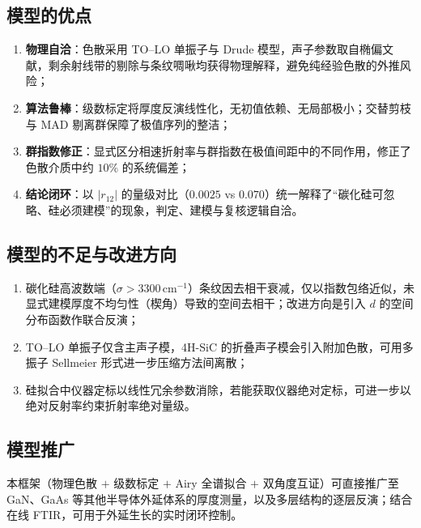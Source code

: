 \documentclass[11pt,a4paper,fontset=fandol]{ctexart}
\newcommand{\invcm}{\,\mathrm{cm^{-1}}}
\begin{document}
\subsection{模型的优点}
\begin{enumerate}[label=（\arabic*）, leftmargin=2.4em, itemsep=0.1em]
    \item \textbf{物理自洽}：色散采用 TO--LO 单振子与 Drude 模型，声子参数取自椭偏文献，剩余射线带的剔除与条纹啁啾均获得物理解释，避免纯经验色散的外推风险；
    \item \textbf{算法鲁棒}：级数标定将厚度反演线性化，无初值依赖、无局部极小；交替剪枝与 MAD 剔离群保障了极值序列的整洁；
    \item \textbf{群指数修正}：显式区分相速折射率与群指数在极值间距中的不同作用，修正了色散介质中约 $10\%$ 的系统偏差；
    \item \textbf{结论闭环}：以 $|r_{12}|$ 的量级对比（$0.0025$ vs $0.070$）统一解释了``碳化硅可忽略、硅必须建模''的现象，判定、建模与复核逻辑自洽。
\end{enumerate}

\subsection{模型的不足与改进方向}
\begin{enumerate}[label=（\arabic*）, leftmargin=2.4em, itemsep=0.1em]
    \item 碳化硅高波数端（$\sigma>3300\invcm$）条纹因去相干衰减，仅以指数包络近似，未显式建模厚度不均匀性（楔角）导致的空间去相干；改进方向是引入 $d$ 的空间分布函数作联合反演；
    \item TO--LO 单振子仅含主声子模，4H-SiC 的折叠声子模会引入附加色散，可用多振子 Sellmeier 形式进一步压缩方法间离散；
    \item 硅拟合中仪器定标以线性冗余参数消除，若能获取仪器绝对定标，可进一步以绝对反射率约束折射率绝对量级。
\end{enumerate}

\subsection{模型推广}
本框架（物理色散 $+$ 级数标定 $+$ Airy 全谱拟合 $+$ 双角度互证）可直接推广至 GaN、GaAs 等其他半导体外延体系的厚度测量，以及多层结构的逐层反演；结合在线 FTIR，可用于外延生长的实时闭环控制。
\end{document}
